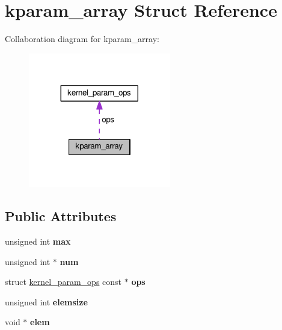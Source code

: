 \hypertarget{structkparam__array}{}\section{kparam\+\_\+array Struct Reference}
\label{structkparam__array}


Collaboration diagram for kparam\+\_\+array\+:
\nopagebreak
\begin{figure}[H]
\begin{center}
\leavevmode
\includegraphics[width=176pt]{structkparam__array__coll__graph}
\end{center}
\end{figure}
\subsection*{Public Attributes}
\begin{DoxyCompactItemize}
\item 
\hypertarget{structkparam__array_a44836e8788f2e3d4f4c02139a5a5dca7}{}unsigned int {\bfseries max}\label{structkparam__array_a44836e8788f2e3d4f4c02139a5a5dca7}

\item 
\hypertarget{structkparam__array_a1cc77cbdc72dc16df21e45a85dd7db52}{}unsigned int $\ast$ {\bfseries num}\label{structkparam__array_a1cc77cbdc72dc16df21e45a85dd7db52}

\item 
\hypertarget{structkparam__array_a0d085554bec69fc95c1aad93f389af13}{}struct \hyperlink{structkernel__param__ops}{kernel\+\_\+param\+\_\+ops} const $\ast$ {\bfseries ops}\label{structkparam__array_a0d085554bec69fc95c1aad93f389af13}

\item 
\hypertarget{structkparam__array_a3e625bc1b2bd8362a7cd7646b17462ba}{}unsigned int {\bfseries elemsize}\label{structkparam__array_a3e625bc1b2bd8362a7cd7646b17462ba}

\item 
\hypertarget{structkparam__array_a404a05ffd0c1f5c7261d58fee7441ba2}{}void $\ast$ {\bfseries elem}\label{structkparam__array_a404a05ffd0c1f5c7261d58fee7441ba2}

\end{DoxyCompactItemize}


